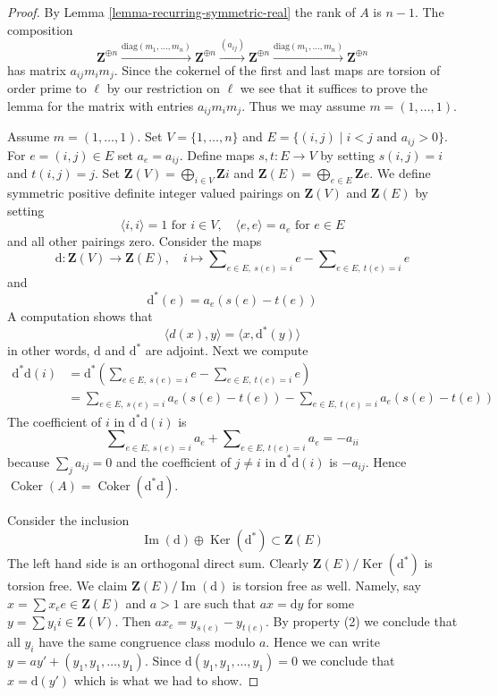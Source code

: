 \documentclass{stacks-project}
\theoremstyle{plain}
\theoremstyle{definition}
\theoremstyle{remark}
\numberwithin{equation}{subsection}
\def\Ker{\mathop{\mathrm{Ker}}}
\def\Im{\mathop{\mathrm{Im}}}
\def\Coker{\mathop{\mathrm{Coker}}}
\begin{document}
\begin{proof}
By Lemma \ref{lemma-recurring-symmetric-real} the rank of $A$ is $n - 1$.
The composition
$$
\mathbf{Z}^{\oplus n} \xrightarrow{\text{diag}(m_1, \ldots, m_n)}
\mathbf{Z}^{\oplus n} \xrightarrow{(a_{ij})}
\mathbf{Z}^{\oplus n} \xrightarrow{\text{diag}(m_1, \ldots, m_n)}
\mathbf{Z}^{\oplus n}
$$
has matrix $a_{ij}m_im_j$. Since the cokernel of the first and last
maps are torsion of order prime to $\ell$ by our restriction on $\ell$
we see that it suffices to prove the lemma for the matrix
with entries $a_{ij}m_im_j$. Thus we may assume $m = (1, \ldots, 1)$.

\medskip\noindent
Assume $m = (1, \ldots, 1)$. Set $V = \{1, \ldots, n\}$ and
$E = \{(i, j) \mid i < j\text{ and }a_{ij} > 0\}$. For
$e = (i, j) \in E$ set $a_e = a_{ij}$. Define maps
$s, t : E \to V$ by setting $s(i, j) = i$ and $t(i, j) = j$.
Set
$\mathbf{Z}(V) = \bigoplus_{i \in V} \mathbf{Z}i$ and
$\mathbf{Z}(E) = \bigoplus_{e \in E} \mathbf{Z}e$.
We define symmetric positive definite integer valued pairings
on $\mathbf{Z}(V)$ and $\mathbf{Z}(E)$ by setting
$$
\langle i, i \rangle = 1\text{ for }i \in V, \quad
\langle e, e \rangle = a_e\text{ for }e \in E
$$
and all other pairings zero. Consider the maps
$$
\text{d} : \mathbf{Z}(V) \to \mathbf{Z}(E), \quad
i \longmapsto
\sum\nolimits_{e \in E,\ s(e) = i} e - \sum\nolimits_{e \in E,\ t(e) = i} e
$$
and
$$
\text{d}^*(e) = a_e(s(e) - t(e))
$$
A computation shows that
$$
\langle d(x), y\rangle = \langle x, \text{d}^*(y) \rangle
$$
in other words, $\text{d}$ and $\text{d}^*$ are adjoint. Next we compute
\begin{align*}
\text{d}^*\text{d}(i)
& = 
\text{d}^*(
\sum\nolimits_{e \in E,\ s(e) = i} e - \sum\nolimits_{e \in E,\ t(e) = i} e) \\
& =
\sum\nolimits_{e \in E,\ s(e) = i} a_e(s(e) - t(e)) -
\sum\nolimits_{e \in E,\ t(e) = i} a_e(s(e) - t(e))
\end{align*}
The coefficient of $i$ in $\text{d}^*\text{d}(i)$ is
$$
\sum\nolimits_{e \in E,\ s(e) = i} a_e +
\sum\nolimits_{e \in E,\ t(e) = i} a_e = - a_{ii}
$$
because $\sum_j a_{ij} = 0$ and the coefficient of
$j \not = i$ in $\text{d}^*\text{d}(i)$ is $-a_{ij}$.
Hence $\Coker(A) = \Coker(\text{d}^*\text{d})$.

\medskip\noindent
Consider the inclusion
$$
\Im(\text{d}) \oplus \Ker(\text{d}^*) \subset \mathbf{Z}(E)
$$
The left hand side is an orthogonal direct sum. Clearly
$\mathbf{Z}(E)/\Ker(\text{d}^*)$ is torsion free.
We claim $\mathbf{Z}(E)/\Im(\text{d})$ is torsion free as well.
Namely, say $x = \sum x_e e \in \mathbf{Z}(E)$ and $a > 1$ are such
that $ax = \text{d}y$ for some $y = \sum y_i i \in \mathbf{Z}(V)$.
Then $a x_e = y_{s(e)} - y_{t(e)}$. By property (2) we conclude
that all $y_i$ have the same congruence class modulo $a$.
Hence we can write $y = a y' + (y_1, y_1, \ldots, y_1)$.
Since $\text{d}(y_1, y_1, \ldots, y_1) = 0$ we conclude
that $x = \text{d}(y')$ which is what we had to show.


\end{proof}
\end{document}
